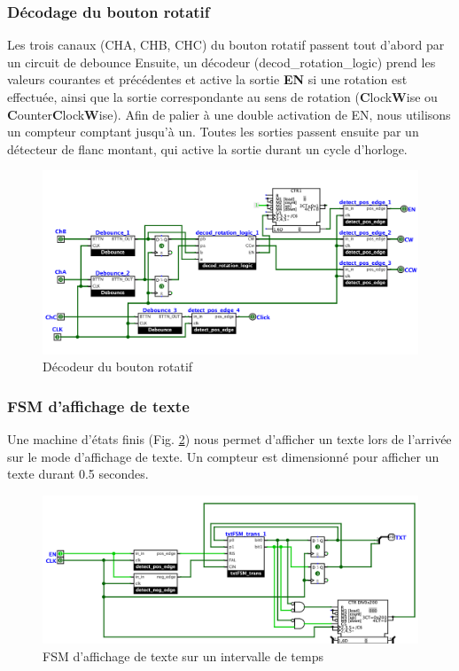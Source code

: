 \documentclass[a4paper, 11pt]{article}
\begin{document}
\subsubsection{Décodage du bouton rotatif}
Les trois canaux (CHA, CHB, CHC) du bouton rotatif passent tout d'abord par un circuit de debounce Ensuite, un décodeur (decod\_rotation\_logic) prend les valeurs courantes et précédentes et active la sortie \textbf{EN} si une rotation est effectuée, ainsi que la sortie correspondante au sens de rotation (\textbf{C}lock\textbf{W}ise ou \textbf{C}ounter\textbf{C}lock\textbf{W}ise). Afin de palier à une double activation de EN, nous utilisons un compteur comptant jusqu'à un. Toutes les sorties passent ensuite par un détecteur de flanc montant, qui active la sortie durant un cycle d'horloge.

\begin{figure}[h]
\centering
\includegraphics[scale=0.5]{figures/decodeRot.png}
\caption{Décodeur du bouton rotatif}
\label{fig:decodeRot}
\end{figure}
\subsubsection{FSM d'affichage de texte}
Une machine d'états finis (Fig. \ref{fig:textFSM}) nous permet d'afficher un texte lors de l'arrivée sur le mode d'affichage de texte. Un compteur est dimensionné pour afficher un texte durant 0.5 secondes.
\begin{figure}[h]
\centering
\includegraphics[scale=0.4]{figures/TextFSM.png}
\caption{FSM d'affichage de texte sur un intervalle de temps}
\label{fig:textFSM}
\end{figure}
\end{document}
